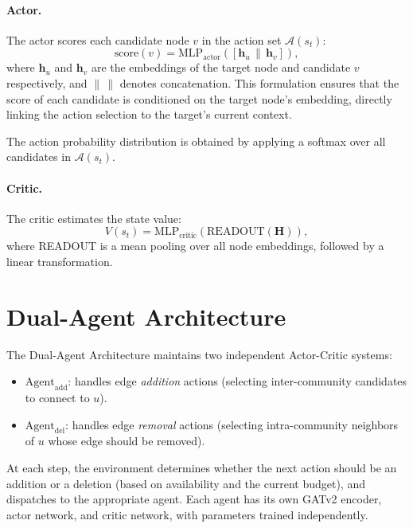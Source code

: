 \documentclass[11pt,a4paper,twoside]{tesis}
\begin{document}
\paragraph{Actor.}
The actor scores each candidate node $v$ in the action set $\mathcal{A}(s_t)$:
\[
\mathrm{score}(v) = \mathrm{MLP}_{\mathrm{actor}}\!\left(\left[
    \mathbf{h}_u \,\|\, \mathbf{h}_v\right]\right),
\]
where $\mathbf{h}_u$ and $\mathbf{h}_v$ are the embeddings of the target node and
candidate $v$ respectively, and $\|\,\|$ denotes concatenation. This formulation ensures
that the score of each candidate is conditioned on the target node's embedding, directly
linking the action selection to the target's current context.

The action probability distribution is obtained by applying a softmax over all
candidates in $\mathcal{A}(s_t)$.

\paragraph{Critic.}
The critic estimates the state value:
\[
V(s_t) = \mathrm{MLP}_{\mathrm{critic}}\!\left(\mathrm{READOUT}(\mathbf{H})\right),
\]
where READOUT is a mean pooling over all node embeddings, followed by a linear
transformation.

\section{Dual-Agent Architecture}
\label{sec:dual}

The Dual-Agent Architecture maintains two independent Actor-Critic systems:
\begin{itemize}
    \item $\mathrm{Agent}_{\mathrm{add}}$: handles edge \emph{addition} actions
      (selecting inter-community candidates to connect to $u$).
    \item $\mathrm{Agent}_{\mathrm{del}}$: handles edge \emph{removal} actions
      (selecting intra-community neighbors of $u$ whose edge should be removed).
\end{itemize}

At each step, the environment determines whether the next action should be an addition
or a deletion (based on availability and the current budget), and dispatches to the
appropriate agent. Each agent has its own GATv2 encoder, actor network, and critic
network, with parameters trained independently.
\end{document}
